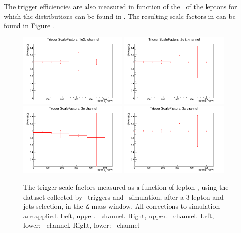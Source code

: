 The trigger efficiencies are also measured in function of the \pt\ of the leptons for which the distributions can be found in . The resulting scale factors in can be found in Figure .
\begin{figure}[htbp]
	\includegraphics[width=0.48\textwidth]{Appendix/Figures/trigger/Intext/SF_trigger_1e2muhistPt.png}
	\includegraphics[width=0.48\textwidth]{Appendix/Figures/trigger/Intext/SF_trigger_2e1muhistPt.png}
	\includegraphics[width=0.48\textwidth]{Appendix/Figures/trigger/Intext/SF_trigger_3ehistPt.png}
	\includegraphics[width=0.48\textwidth]{Appendix/Figures/trigger/Intext/SF_trigger_3muhistPt.png}
	
	\caption{The trigger scale factors measured as a function of lepton \pt, using the dataset collected by \Etmis\ triggers and \WZ\ simulation, after a 3 lepton and jets selection, in the Z mass window. All corrections to simulation are applied. Left, upper: \emumu\ channel. Right, upper: \eemu\ channel. Left, lower: \eee\ channel. Right, lower: \mumumu\ channel}
	\label{image:FigurestriggerIntext}
\end{figure}
